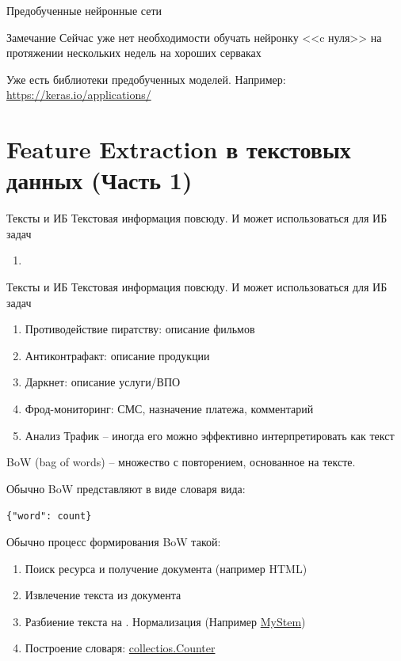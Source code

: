 \begin{frame}{Предобученные нейронные сети}
	
	\begin{block}{Замечание}
	Сейчас уже нет необходимости обучать нейронку <<c нуля>>
	на протяжении нескольких недель на хороших серваках
	
	Уже есть библиотеки предобученных моделей. 
	Например: \url{https://keras.io/applications/}
	\end{block}
\end{frame}


\section{Feature Extraction в текстовых данных (Часть 1)}\label{section:texts_fe1}


\begin{frame}{Тексты и ИБ}
	Текстовая информация повсюду. 
	И может использоваться для ИБ задач
	\begin{enumerate}
		\item {}
	\end{enumerate}
\end{frame}


\begin{frame}{Тексты и ИБ}
	Текстовая информация повсюду. 
	И может использоваться для ИБ задач
	\begin{enumerate}
		\item Противодействие пиратству: описание фильмов
		\item Антиконтрафакт: описание продукции
		\item Даркнет: описание услуги/ВПО
		\item Фрод-мониторинг: СМС, назначение платежа, комментарий
		\item Анализ Трафик -- иногда его можно эффективно интерпретировать как текст
	\end{enumerate}
\end{frame}

\begin{frame}[fragile]{BoW}
	 (bag of words) -- множество с повторением, 
	основанное на тексте.
	
	Обычно BoW представляют в виде словаря вида:
	\begin{center}
		\texttt{\{"word": count\}}
	\end{center}
		
	Обычно процесс формирования BoW такой:
	\begin{enumerate}
		\item Поиск ресурса и получение документа (например HTML)

		\item Извлечение текста из документа
		\item Разбиение текста на . 
		Нормализация (Например \href{https://yandex.ru/dev/mystem/}{MyStem})
		\item Построение словаря: \href{https://docs.python.org/3/library/collections.html\#collections.Counter}{collectios.Counter}
	\end{enumerate}
\end{frame}

